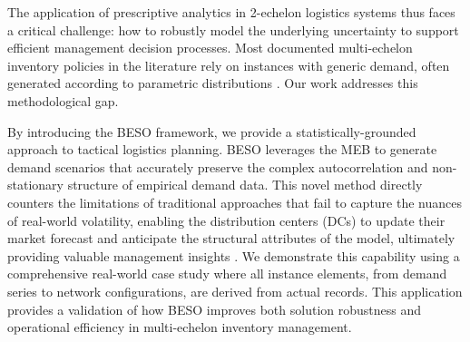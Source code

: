 \documentclass[a4paper,fleqn,3p,11pt,authoryear]{cas-sc}
\begin{document}
The application of prescriptive analytics in 2-echelon logistics systems thus faces a critical challenge: how to robustly model the underlying uncertainty to support efficient management decision processes. Most documented multi-echelon inventory policies in the literature rely on instances with generic demand, often generated according to parametric distributions \citep{Escorcia20,EG81}. Our work addresses this methodological gap.

By introducing the BESO framework, we provide a statistically-grounded approach to tactical logistics planning. BESO leverages the MEB to generate demand scenarios that accurately preserve the complex autocorrelation and non-stationary structure of empirical demand data. This novel method directly counters the limitations of traditional approaches that fail to capture the nuances of real-world volatility, enabling the distribution centers (DCs) to update their market forecast and anticipate the structural attributes of the model, ultimately providing valuable management insights \citep{P16}. We demonstrate this capability using a comprehensive real-world case study where all instance elements, from demand series to network configurations, are derived from actual records. This application provides a validation of how BESO improves both solution robustness and operational efficiency in multi-echelon inventory management.


\end{document}
